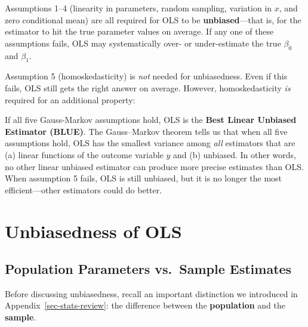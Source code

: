 \documentclass[
  letterpaper,
  DIV=11,
  numbers=noendperiod]{scrreprt}
\begin{document}
Assumptions 1--4 (linearity in parameters, random sampling, variation in
\(x\), and zero conditional mean) are all required for OLS to be
\textbf{unbiased}---that is, for the estimator to hit the true parameter
values on average. If any one of these assumptions fails, OLS may
systematically over- or under-estimate the true \(\beta_0\) and
\(\beta_1\).

Assumption 5 (homoskedasticity) is \emph{not} needed for unbiasedness.
Even if this fails, OLS still gets the right answer on average. However,
homoskedasticity \emph{is} required for an additional property:

\begin{tcolorbox}[enhanced jigsaw, arc=.35mm, bottomrule=.15mm, bottomtitle=1mm, breakable, colback=white, colbacktitle=quarto-callout-note-color!10!white, colframe=quarto-callout-note-color-frame, coltitle=black, left=2mm, leftrule=.75mm, opacityback=0, opacitybacktitle=0.6, rightrule=.15mm, title=\textcolor{quarto-callout-note-color}{\faInfo}\hspace{0.5em}{\textbf{BLUE}}, titlerule=0mm, toprule=.15mm, toptitle=1mm]

If all five Gauss-Markov assumptions hold, OLS is the \textbf{Best
Linear Unbiased Estimator (BLUE)}. The Gauss--Markov theorem tells us
that when all five assumptions hold, OLS has the smallest variance among
\emph{all} estimators that are (a) linear functions of the outcome
variable \(y\) and (b) unbiased. In other words, no other linear
unbiased estimator can produce more precise estimates than OLS. When
assumption 5 fails, OLS is still unbiased, but it is no longer the most
efficient---other estimators could do better.

\end{tcolorbox}

\section{Unbiasedness of OLS}\label{unbiasedness-of-ols}

\subsection{Population Parameters vs.~Sample
Estimates}\label{population-parameters-vs.-sample-estimates}

Before discussing unbiasedness, recall an important distinction we
introduced in Appendix~\ref{sec-stats-review}: the difference between
the \textbf{population} and the \textbf{sample}.
\end{document}
